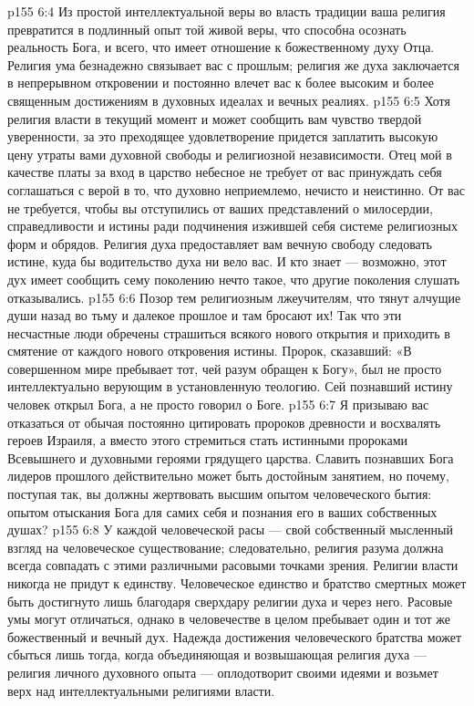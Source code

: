 \vs p155 6:4 Из простой интеллектуальной веры во власть традиции ваша религия превратится в подлинный опыт той живой веры, что способна осознать реальность Бога, и всего, что имеет отношение к божественному духу Отца. Религия ума безнадежно связывает вас с прошлым; религия же духа заключается в непрерывном откровении и постоянно влечет вас к более высоким и более священным достижениям в духовных идеалах и вечных реалиях.
\vs p155 6:5 Хотя религия власти в текущий момент и может сообщить вам чувство твердой уверенности, за это преходящее удовлетворение придется заплатить высокую цену утраты вами духовной свободы и религиозной независимости. Отец мой в качестве платы за вход в царство небесное не требует от вас принуждать себя соглашаться с верой в то, что духовно неприемлемо, нечисто и неистинно. От вас не требуется, чтобы вы отступились от ваших представлений о милосердии, справедливости и истины ради подчинения изжившей себя системе религиозных форм и обрядов. Религия духа предоставляет вам вечную свободу следовать истине, куда бы водительство духа ни вело вас. И кто знает --- возможно, этот дух имеет сообщить сему поколению нечто такое, что другие поколения слушать отказывались.
\vs p155 6:6 Позор тем религиозным лжеучителям, что тянут алчущие души назад во тьму и далекое прошлое и там бросают их! Так что эти несчастные люди обречены страшиться всякого нового открытия и приходить в смятение от каждого нового откровения истины. Пророк, сказавший: «В совершенном мире пребывает тот, чей разум обращен к Богу», был не просто интеллектуально верующим в установленную теологию. Сей познавший истину человек открыл Бога, а не просто говорил о Боге.
\vs p155 6:7 Я призываю вас отказаться от обычая постоянно цитировать пророков древности и восхвалять героев Израиля, а вместо этого стремиться стать истинными пророками Всевышнего и духовными героями грядущего царства. Славить познавших Бога лидеров прошлого действительно может быть достойным занятием, но почему, поступая так, вы должны жертвовать высшим опытом человеческого бытия: опытом отыскания Бога для самих себя и познания его в ваших собственных душах?
\vs p155 6:8 У каждой человеческой расы --- свой собственный мысленный взгляд на человеческое существование; следовательно, религия разума должна всегда совпадать с этими различными расовыми точками зрения. Религии власти никогда не придут к единству. Человеческое единство и братство смертных может быть достигнуто лишь благодаря сверхдару религии духа и через него. Расовые умы могут отличаться, однако в человечестве в целом пребывает один и тот же божественный и вечный дух. Надежда достижения человеческого братства может сбыться лишь тогда, когда объединяющая и возвышающая религия духа --- религия личного духовного опыта --- оплодотворит своими идеями и возьмет верх над интеллектуальными религиями власти.
